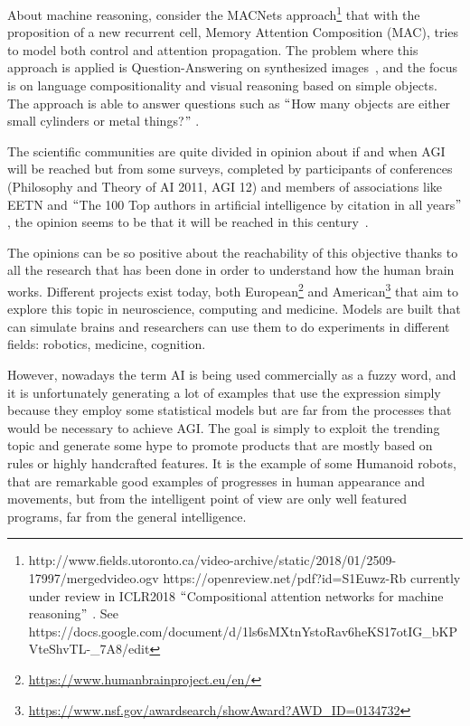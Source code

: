 About machine reasoning, consider the MACNets approach\footnote{ http://www.fields.utoronto.ca/video-archive/static/2018/01/2509-17997/mergedvideo.ogv https://openreview.net/pdf?id=S1Euwz-Rb currently under review in ICLR2018 $``$Compositional attention networks for machine reasoning$"$ . See https://docs.google.com/document/d/1ls6sMXtnYstoRav6heKS17otIG\_bKPVteShvTL-\_7A8/edit  } that with the proposition of a new recurrent cell, Memory Attention Composition (MAC), tries to model both control and attention propagation. The problem where this approach is applied is Question-Answering on synthesized images~\cite{johnson2017clevr}, and the focus is on language compositionality and visual reasoning based on simple objects. The approach is able to answer questions such as $``$How many objects are either small cylinders or metal things?$"$ .

The scientific communities are quite divided in opinion about if and when AGI will be reached but from some surveys, completed by participants of conferences (Philosophy and Theory of AI 2011, AGI 12) and members of associations like EETN and $``$The 100 Top authors in artificial intelligence by citation in all years$"$ , the opinion seems to be that it will be reached in this century~\cite{muller2016future}.

The opinions can be so positive about the reachability of this objective thanks to all the research that has been done in order to understand how the human brain works. Different projects exist today, both European\footnote{\url{https://www.humanbrainproject.eu/en/}} and American\footnote{\url{https://www.nsf.gov/awardsearch/showAward?AWD\_ID=0134732}} that aim to explore this topic in neuroscience, computing and medicine. Models are built that can simulate brains and researchers can use them to do experiments in different fields: robotics, medicine, cognition.

However, nowadays the term AI is being used commercially as a fuzzy word, and it is unfortunately generating a lot of examples that use the expression simply because they employ some statistical models but are far from the processes that would be necessary to achieve AGI. The goal is simply to exploit the trending topic and generate some hype to promote products that are mostly based on rules or highly handcrafted features. It is the example of some Humanoid robots, that are remarkable good examples of progresses in human appearance and movements, but from the intelligent point of view are only well featured programs, far from the general intelligence.

